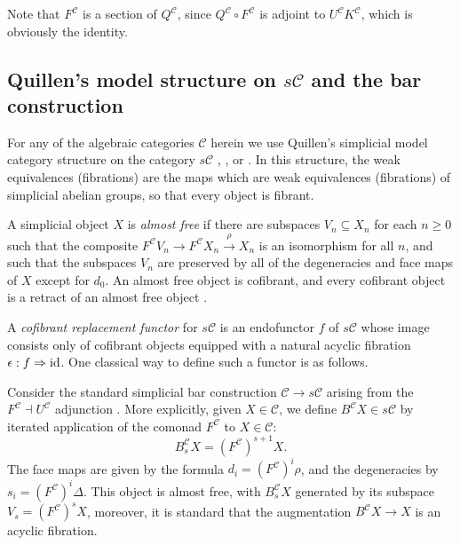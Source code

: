 \documentclass[11pt]{amsart}
\theoremstyle{plain}
\theoremstyle{definition}
\renewcommand{\to}{\longrightarrow}
\newcommand{\calc}{\mathcal{C}}
\theoremstyle{plain}
\newcommand{\Id}{\textup{id}}
\begin{document}
\begin{Conventions and notation}
Note that $F^\calc$ is a section of $Q^{\calc}$, since $Q^{\calc}\circ F^{\calc}$ is adjoint to $U^\calc K^\calc$, which is obviously the identity.

\subsection{Quillen's model structure on $s\calc$ and the bar construction}\label{ssec: quillen model and bar construction}
For any of the algebraic categories $\calc$ herein we use Quillen's simplicial model category structure on the category $s\calc$ \cite{QuillenHomAlg.pdf}, \cite{MillerSullivanConjecture.pdf}, or \cite{Blanc_Stover-Groth_SS.pdf}. In this structure, the weak equivalences (fibrations) are the maps which are weak equivalences (fibrations) of simplicial abelian groups, so that every object is fibrant. 

 A simplicial object $X$ is \emph{almost free} if there are subspaces $V_n\subseteq X_n$ for each $n\geq0$ such that the composite $F^\calc  V_n\to F^\calc  X_n\overset{\rho}{\to} X_n$ is an isomorphism for all $n$, and such that the subspaces $V_n$ are preserved by all of the degeneracies and face maps of $X$ except for $d_0$. An almost free object is cofibrant, and every cofibrant object is a retract of an almost free object \cite[\S3]{MillerSullivanConjecture.pdf}.

A \emph{cofibrant replacement functor} for $s\calc$  is an endofunctor $f$ of $s\calc$ whose image consists only of cofibrant objects equipped with  a natural acyclic fibration $\epsilon:f\Rightarrow \Id $. One classical way to define such a functor is as follows.

Consider the standard simplicial bar construction $\calc\to s\calc$ arising from the $F^\calc\dashv U^\calc$ adjunction \cite{BlumRiehlResolutions.pdf}. More explicitly, given $X\in\calc$, we define $B^\calc X\in s\calc$ by iterated application of the comonad $F^\calc$ to $X\in \calc$:
\[B_s^\calc X=(F^\calc)^{s+1}X.\]
The face maps are given by the formula $d_i=(F^\calc)^i\rho$, and the degeneracies by $s_i=(F^\calc)^i\Delta$. %
This object is almost free, with $B_s^\calc X$ generated by its subspace $V_s=(F^\calc )^sX$, moreover, it is standard \cite[\S4]{BlumRiehlResolutions.pdf} that the augmentation $B^\calc X\to X$ is an acyclic fibration.


\end{Conventions and notation}
\end{document}

